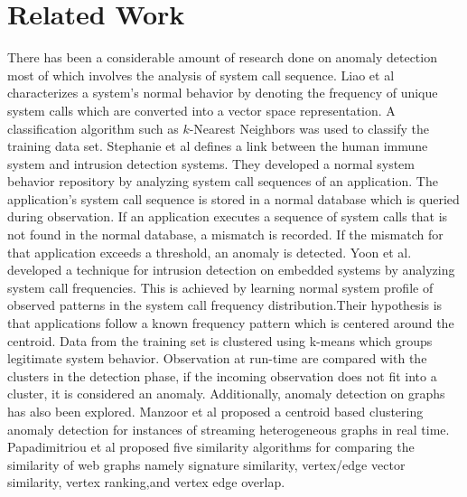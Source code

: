 %




\section{Related Work}

There has been a considerable amount of research done on anomaly detection most of which involves the analysis of system call sequence. Liao et al \cite{liao_using_2002} characterizes a system's normal behavior by denoting the frequency of unique system calls which are converted into a vector space representation. A classification algorithm such as $k$-Nearest Neighbors was used to classify the training data set. Stephanie et al \cite{Hofmeyr} defines a link between the human immune system and intrusion detection systems. They developed a normal system behavior repository by analyzing system call sequences of an application. The application's system call sequence is stored in a normal database which is queried during observation. If an application executes a sequence of system calls that is not found in the normal database, a mismatch is recorded. If the mismatch for that application exceeds a threshold, an anomaly is detected. Yoon et al. \cite{Yoon} developed a technique for intrusion detection on embedded systems by analyzing system call frequencies. This is achieved by learning normal system profile of observed patterns in the system call frequency distribution.Their hypothesis is that applications follow a known frequency pattern which is centered around the centroid. Data from the training set is  clustered using k-means which groups legitimate system behavior. Observation at run-time are compared with the clusters in the detection phase, if the incoming observation does not fit into a cluster, it is considered an anomaly. Additionally, anomaly detection on graphs has also been explored. Manzoor et al \cite{manzoor_fast_2016} proposed a centroid based clustering anomaly detection for instances of streaming heterogeneous graphs in real time. Papadimitriou et al \cite{Papadimitriou2010} proposed five similarity algorithms for comparing the similarity of web graphs namely signature similarity, vertex/edge vector similarity, vertex ranking,and vertex edge overlap. 




